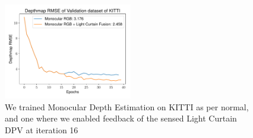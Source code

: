 \begin{figure}[h]
   \centering
   \begin{minipage}{0.5\textwidth}
       \centering
       \includegraphics[width=0.5\textwidth]{figures/Figure_10.pdf}
   \end{minipage}\hfill
   \centering
   \caption{We trained Monocular Depth Estimation on KITTI as per normal, and one where we enabled feedback of the sensed Light Curtain DPV at iteration 16}
   \label{fig:lfusion} 
\end{figure}

